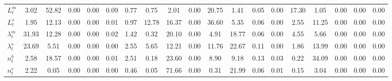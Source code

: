 \begin{center}
\begin{longtable}{lcccccccccccccccccc}
$ L^m_t             $	 & 	             3.02	 & 	            52.82	 & 	             0.00	 & 	             0.00	 & 	             0.09	 & 	             0.77	 & 	             0.75	 & 	             2.01	 & 	             0.00	 & 	            20.75	 & 	             1.41	 & 	             0.05	 & 	             0.00	 & 	            17.30	 & 	             1.05	 & 	             0.00	 & 	             0.00	 & 	             0.00 \\ 
$ L^s_t             $	 & 	             1.95	 & 	            12.13	 & 	             0.00	 & 	             0.00	 & 	             0.01	 & 	             0.97	 & 	            12.78	 & 	            16.37	 & 	             0.00	 & 	            36.60	 & 	             5.35	 & 	             0.06	 & 	             0.00	 & 	             2.55	 & 	            11.25	 & 	             0.00	 & 	             0.00	 & 	             0.00 \\ 
$ \lambda^m_t       $	 & 	            31.93	 & 	            12.28	 & 	             0.00	 & 	             0.00	 & 	             0.02	 & 	             1.42	 & 	             0.32	 & 	            20.10	 & 	             0.00	 & 	             4.91	 & 	            18.77	 & 	             0.06	 & 	             0.00	 & 	             4.55	 & 	             5.66	 & 	             0.00	 & 	             0.00	 & 	             0.00 \\ 
$ \lambda^s_t       $	 & 	            23.69	 & 	             5.51	 & 	             0.00	 & 	             0.00	 & 	             0.00	 & 	             2.55	 & 	             5.65	 & 	            12.21	 & 	             0.00	 & 	            11.76	 & 	            22.67	 & 	             0.11	 & 	             0.00	 & 	             1.86	 & 	            13.99	 & 	             0.00	 & 	             0.00	 & 	             0.00 \\ 
$ n^b_t             $	 & 	             2.58	 & 	            18.57	 & 	             0.00	 & 	             0.00	 & 	             0.01	 & 	             2.51	 & 	             0.18	 & 	            23.60	 & 	             0.00	 & 	             8.90	 & 	             9.18	 & 	             0.13	 & 	             0.03	 & 	             0.22	 & 	            34.09	 & 	             0.00	 & 	             0.00	 & 	             0.00 \\ 
$ n^e_t             $	 & 	             2.22	 & 	             0.05	 & 	             0.00	 & 	             0.00	 & 	             0.00	 & 	             0.46	 & 	             0.05	 & 	            71.66	 & 	             0.00	 & 	             0.31	 & 	            21.99	 & 	             0.06	 & 	             0.01	 & 	             0.15	 & 	             3.04	 & 	             0.00	 & 	             0.00	 & 	             0.00 \\ 

\end{longtable}
\end{center}
